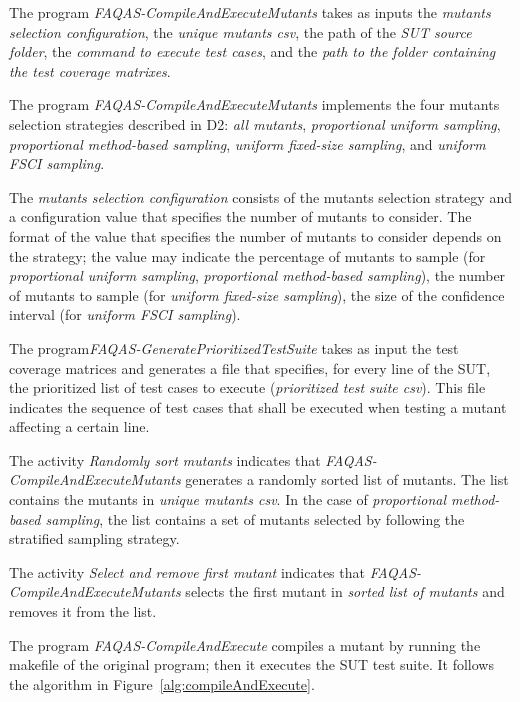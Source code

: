 \RQ{} The program \emph{FAQAS-CompileAndExecuteMutants} takes as inputs the \emph{mutants selection configuration}, the \emph{unique mutants csv}, the path of the \emph{SUT source folder}, the \emph{command to execute test cases}, and the \emph{path to the folder containing the test coverage matrixes}.

\RQ{} The program \emph{FAQAS-CompileAndExecuteMutants} implements the four mutants selection strategies described in D2: \emph{all mutants}, \emph{proportional uniform sampling}, \emph{proportional method-based sampling}, \emph{uniform fixed-size sampling}, and \emph{uniform FSCI sampling}.

\RQ{} The \emph{mutants selection configuration} consists of the mutants selection strategy and a configuration value that specifies the number of mutants to consider. The format of the value that specifies the number of mutants to consider depends on the strategy; the value may indicate the percentage of mutants to sample (for \emph{proportional uniform sampling}, \emph{proportional method-based sampling}), the number of mutants to sample (for \emph{uniform fixed-size sampling}), the size of the confidence interval (for \emph{uniform FSCI sampling}).

\RQ{} The program\emph{FAQAS-GeneratePrioritizedTestSuite} takes as input the test coverage matrices and generates a file that specifies, for every line of the SUT, the prioritized list of test cases to execute (\emph{prioritized test suite csv}). This file indicates the sequence of test cases that shall be executed when testing a mutant affecting a certain line.

\RQ{} The activity \emph{Randomly sort mutants} indicates that  \emph{FAQAS-CompileAndExecuteMutants} generates a randomly sorted list of mutants. The list contains the mutants in \emph{unique mutants csv}.
In the case of \emph{proportional method-based sampling}, the list contains a set of mutants selected by following the stratified sampling strategy.

\RQ{} The activity \emph{Select and remove first mutant} indicates that  \emph{FAQAS-CompileAndExecuteMutants} selects the first mutant in \emph{sorted list of mutants} and removes it from the list.

\RQ{} The program \emph{FAQAS-CompileAndExecute} compiles a mutant by running the makefile of the original program; then it executes the SUT test suite. It follows the algorithm in Figure~\ref{alg:compileAndExecute}.



